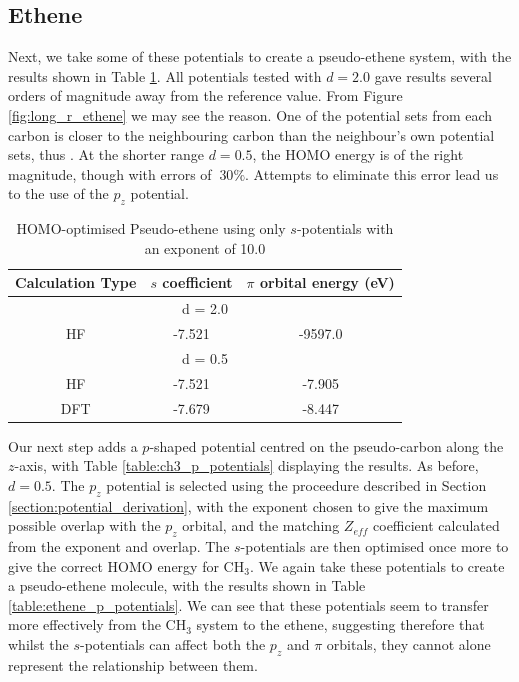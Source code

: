 \documentclass[journal=jctcce,manuscript=article]{achemso}
\begin{document}
\subsection{Ethene}

Next, we take some of these potentials to create a pseudo-ethene system, with the results shown in Table \ref{table:ethene_s_pseudo}. All potentials tested with \(d = 2.0\) gave results several orders of magnitude away from the reference value. From Figure \ref{fig:long_r_ethene} we may see the reason. One of the potential sets from each carbon is closer to the neighbouring carbon than the neighbour's own potential sets, thus . At the shorter range \(d = 0.5\), the HOMO energy is of the right magnitude, though with errors of \(~ 30\%\). Attempts to eliminate this error lead us to the use of the \(p_{z}\) potential. 

\begin{table}[ht]
\caption{HOMO-optimised Pseudo-ethene using only \(s\)-potentials with an exponent of 10.0}

\begin{tabular}{c c c}
\hline\hline
Calculation Type & \(s\) coefficient & \( \pi \) orbital energy (eV) \\
\hline
\multicolumn{3}{c}{d = 2.0} \\
\hline
HF & -7.521 & -9597.0 \\
\hline
\multicolumn{3}{c}{d = 0.5} \\
\hline
HF & -7.521 & -7.905 \\
DFT & -7.679 & -8.447 \\
\hline
\end{tabular}
\label{table:ethene_s_pseudo}
\end{table}

Our next step adds a \(p\)-shaped potential centred on the pseudo-carbon along the \(z\)-axis, with Table \ref{table:ch3_p_potentials} displaying the results. As before, \(d = 0.5\). The \(p_{z}\) potential is selected using the proceedure described in Section \ref{section:potential_derivation}, with the exponent chosen to give the maximum possible overlap with the \(p_{z}\) orbital, and the matching \(Z_{eff}\) coefficient calculated from the exponent and overlap. The \(s\)-potentials are then optimised once more to give the correct HOMO energy for CH\(_{3}\). We again take these potentials to create a pseudo-ethene molecule, with the results shown in Table \ref{table:ethene_p_potentials}. We can see that these potentials seem to transfer more effectively from the CH\(_{3}\) system to the ethene, suggesting therefore that whilst the \(s\)-potentials can affect both the \(p_{z}\) and \(\pi\) orbitals, they cannot alone represent the relationship between them.
\end{document}
